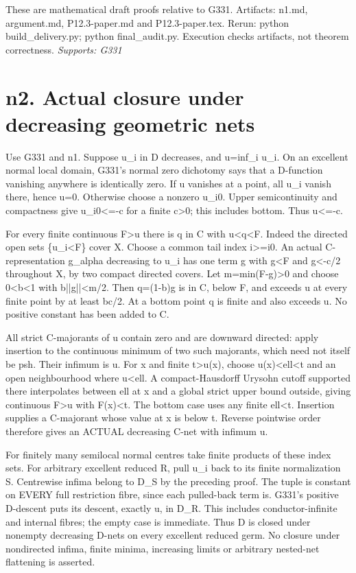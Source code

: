 \documentclass[11pt]{article}
\begin{document}
These are mathematical draft proofs relative to G331. Artifacts: n1.md, argument.md, P12.3-paper.md and P12.3-paper.tex. Rerun: python build\_delivery.py; python final\_audit.py. Execution checks artifacts, not theorem correctness.
\textit{Supports: G331}

\section{n2. Actual closure under decreasing geometric nets}

Use G331 and n1. Suppose u\_i in D decreases, and u=inf\_i u\_i. On an excellent normal local domain, G331's normal zero dichotomy says that a D-function vanishing anywhere is identically zero. If u vanishes at a point, all u\_i vanish there, hence u=0. Otherwise choose a nonzero u\_i0. Upper semicontinuity and compactness give u\_i0<=-c for a finite c>0; this includes bottom. Thus u<=-c.

For every finite continuous F>u there is q in C with u<q<F. Indeed the directed open sets \{u\_i<F\} cover X. Choose a common tail index i>=i0. An actual C-representation g\_alpha decreasing to u\_i has one term g with g<F and g<-c/2 throughout X, by two compact directed covers. Let m=min(F-g)>0 and choose 0<b<1 with b||g||<m/2. Then q=(1-b)g is in C, below F, and exceeds u at every finite point by at least bc/2. At a bottom point q is finite and also exceeds u. No positive constant has been added to C.

All strict C-majorants of u contain zero and are downward directed: apply insertion to the continuous minimum of two such majorants, which need not itself be psh. Their infimum is u. For x and finite t>u(x), choose u(x)<ell<t and an open neighbourhood where u<ell. A compact-Hausdorff Urysohn cutoff supported there interpolates between ell at x and a global strict upper bound outside, giving continuous F>u with F(x)<t. The bottom case uses any finite ell<t. Insertion supplies a C-majorant whose value at x is below t. Reverse pointwise order therefore gives an ACTUAL decreasing C-net with infimum u.

For finitely many semilocal normal centres take finite products of these index sets. For arbitrary excellent reduced R, pull u\_i back to its finite normalization S. Centrewise infima belong to D\_S by the preceding proof. The tuple is constant on EVERY full restriction fibre, since each pulled-back term is. G331's positive D-descent puts its descent, exactly u, in D\_R. This includes conductor-infinite and internal fibres; the empty case is immediate. Thus D is closed under nonempty decreasing D-nets on every excellent reduced germ. No closure under nondirected infima, finite minima, increasing limits or arbitrary nested-net flattening is asserted.
\end{document}
